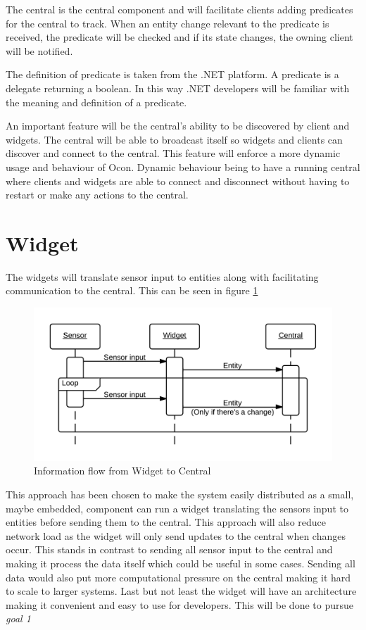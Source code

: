 \documentclass[../report.tex]{subfiles}
\begin{document}
The central is the central component and will facilitate clients adding predicates for the central to track. When an entity change relevant to the predicate is received, the predicate will be checked and if its state changes, the owning client will be notified.

The definition of predicate is taken from the .NET platform. A predicate is a delegate returning a boolean. In this way .NET developers will be familiar with the meaning and definition of a predicate.

An important feature will be the central's ability to be discovered by client and widgets. The central will be able to broadcast itself so widgets and clients can discover and connect to the central. This feature will enforce a more dynamic usage and behaviour of Ocon. Dynamic behaviour being to have a running central where clients and widgets are able to connect and disconnect without having to restart or make any actions to the central.
 
\section{Widget}

The widgets will translate sensor input to entities along with facilitating communication to the central. This can be seen in figure \ref{fig:seqwidget}

\begin{figure}[h]
\centering
\includegraphics[scale=0.2]{sequencediagram-widget.png}
\caption{Information flow from Widget to Central}
\label{fig:seqwidget}
\end{figure}

This approach has been chosen to make the system easily distributed as a small, maybe embedded, component can run a widget translating the sensors input to entities before sending them to the central. This approach will also reduce network load as the widget will only send updates to the central when changes occur. This stands in contrast to sending all sensor input to the central and making it process the data itself which could be useful in some cases. Sending all data would also put more computational pressure on the central making it hard to scale to larger systems. Last but not least the widget will have an architecture making it convenient and easy to use for developers. This will be done to pursue \textit{goal 1}
\end{document}
